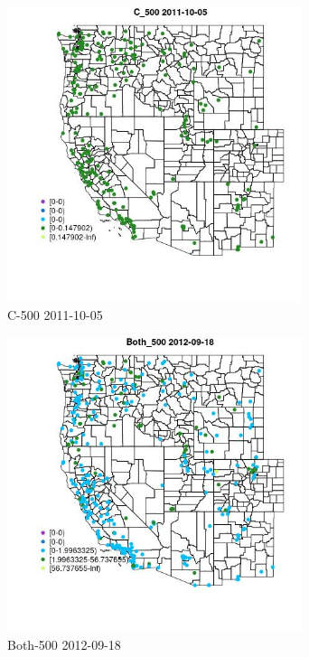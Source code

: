 \begin{figure} 
\centering  
\includegraphics[width=0.77\textwidth]{Code_Outputs/ML_input_report_ML_input_PM25_Step5_part_d_de_duplicated_aves_ML_input_MapObsC_5002011-10-05.jpg} 
\caption{\label{fig:ML_input_report_ML_input_PM25_Step5_part_d_de_duplicated_aves_ML_inputMapObsC_5002011-10-05}C-500 2011-10-05} 
\end{figure} 
 

\begin{figure} 
\centering  
\includegraphics[width=0.77\textwidth]{Code_Outputs/ML_input_report_ML_input_PM25_Step5_part_d_de_duplicated_aves_ML_input_MapObsBoth_5002012-09-18.jpg} 
\caption{\label{fig:ML_input_report_ML_input_PM25_Step5_part_d_de_duplicated_aves_ML_inputMapObsBoth_5002012-09-18}Both-500 2012-09-18} 
\end{figure} 
 

